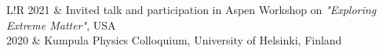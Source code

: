 \documentclass[letterpaper, onecolumn, 11pt]{article}
\newcommand\VRule{\color{lightgray}\vrule width 0.5pt}
\begin{document}
\begin{tabular}{L!{\VRule}R}
  2021 & Invited talk and participation in Aspen Workshop on \textit{"Exploring Extreme Matter"}, USA \\
  2020 & Kumpula Physics Colloquium, University of Helsinki, Finland \\

\end{tabular}
\end{document}
